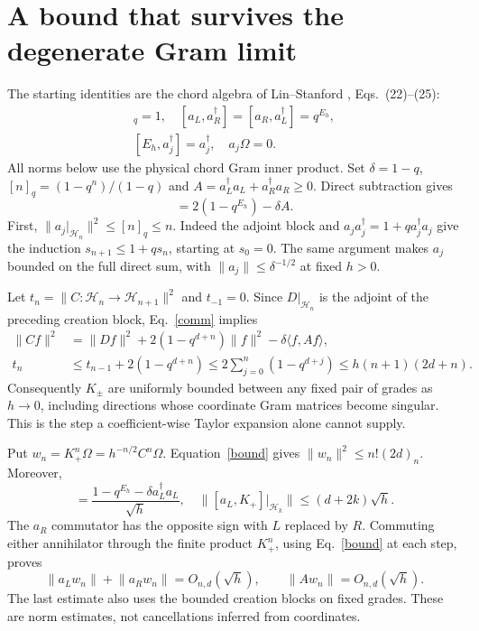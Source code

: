 \documentclass[11pt,a4paper]{article}
\newcommand{\norm}[1]{\lVert#1\rVert}
\begin{document}
\newpage
\section{A bound that survives the degenerate Gram limit}
The starting identities are the chord algebra of Lin--Stanford
\cite{LS}, Eqs.~(22)--(25):
\begin{gather}
 [a_j,a_j^\dagger]_q=1,\quad
 [a_L,a_R^\dagger]=[a_R,a_L^\dagger]=q^{E_h},\nonumber\\
 [E_h,a_j^\dagger]=a_j^\dagger,\quad a_j\Omega=0.
\end{gather}
All norms below use the physical chord Gram inner product. Set
$\delta=1-q$, $[n]_q=(1-q^n)/(1-q)$ and
$A=a_L^\dagger a_L+a_R^\dagger a_R\ge0$. Direct subtraction gives
\begin{equation}
 [D,C]=2(1-q^{E_h})-\delta A.\label{comm}
\end{equation}
First, $\norm{a_j|_{\mathcal H_n}}^2\le[n]_q\le n$.
Indeed the adjoint block and $a_ja_j^\dagger=1+q a_j^\dagger a_j$
give the induction $s_{n+1}\le1+q s_n$, starting at $s_0=0$.
The same argument makes $a_j$ bounded on the full direct sum, with
$\norm{a_j}\le\delta^{-1/2}$ at fixed $h>0$.

Let $t_n=\norm{C:\mathcal H_n\to\mathcal H_{n+1}}^2$ and
$t_{-1}=0$. Since $D|_{\mathcal H_n}$ is the adjoint of the preceding
creation block, Eq.~\eqref{comm} implies
\begin{align}
 \norm{Cf}^2&=\norm{Df}^2+2(1-q^{d+n})\norm f^2
             -\delta\langle f,Af\rangle,\nonumber\\
 t_n&\le t_{n-1}+2(1-q^{d+n})
 \le2\sum_{j=0}^n(1-q^{d+j})
 \le h(n+1)(2d+n).\label{bound}
\end{align}
Consequently $K_\pm$ are uniformly bounded between any fixed pair of
grades as $h\to0$, including directions whose coordinate Gram matrices
become singular. This is the step a coefficient-wise Taylor expansion
alone cannot supply.

Put $w_n=K_+^n\Omega=h^{-n/2}C^n\Omega$. Equation~\eqref{bound} gives
$\norm{w_n}^2\le n!(2d)_n$. Moreover,
\begin{equation}
 [a_L,K_+]=\frac{1-q^{E_h}-\delta a_L^\dagger a_L}{\sqrt h},
 \quad
 \norm{[a_L,K_+]|_{\mathcal H_k}}\le(d+2k)\sqrt h.\label{small}
\end{equation}
The $a_R$ commutator has the opposite sign with $L$ replaced by $R$.
Commuting either annihilator through the finite product $K_+^n$, using
Eq.~\eqref{bound} at each step, proves
\begin{equation}
 \norm{a_Lw_n}+\norm{a_Rw_n}=O_{n,d}(\sqrt h),\qquad
 \norm{Aw_n}=O_{n,d}(\sqrt h).\label{A}
\end{equation}
The last estimate also uses the bounded creation blocks on fixed grades.
These are norm estimates, not cancellations inferred from coordinates.
\end{document}

